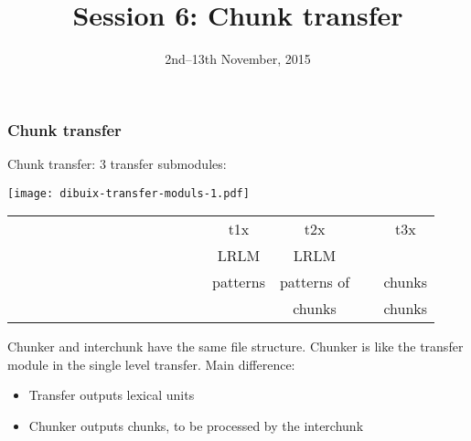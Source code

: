 \documentclass[10pt,xetex]{beamer} %
\date{2nd--13th November, 2015}
\title{Session 6: Chunk transfer}
\begin{document}
\begin{frame}
        \titlepage
\MyLogoBottomCentred
\end{frame}


\begin{frame}
\frametitle{Chunk transfer} %

Chunk transfer: 3 transfer submodules:
\newline


\begin{center}
\texttt{[image: dibuix-transfer-moduls-1.pdf]}
\end{center}

\begin{tabular}{lccc}
~~~~~~~~~~~~~~~~~~~~~~~~~  &t1x & t2x & ~~ t3x \\
~~~~~~~~~~~~~~~~~~~~~~~~~  &LRLM & LRLM & ~~ \\
~~~~~~~~~~~~~~~~~~~~~~~~~  &patterns & patterns of & ~~ chunks \\
~~~~~~~~~~~~~~~~~~~~~~~~~ & ~~ & chunks & ~~ chunks

\end{tabular}
\newline
\newline
\newline
\newline
Chunker and interchunk have the same \alert{file structure}.
Chunker is like the transfer module in the single level transfer.
Main difference: 
\begin{itemize}
\item Transfer outputs \alert{lexical units}
\item Chunker outputs \alert{chunks}, to be processed by the interchunk
\end{itemize}
\end{frame}
\end{document}
